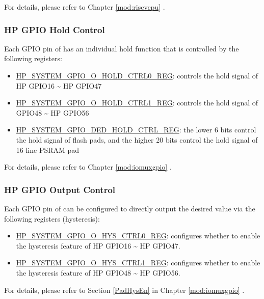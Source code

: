 \documentclass[main\_\_EN.tex]{subfiles}
\begin{document}
For details, please refer to Chapter \ref{mod:riscvcpu} \textit{}.

\subsubsection{HP GPIO Hold Control}

Each GPIO pin of \chipname{} has an individual hold function that is controlled by the following registers:

\begin{itemize}
    \item \hyperref[regdesc:HPSYSTEMGPIOOHOLDCTRL0REG]{HP\_SYSTEM\_GPIO\_O\_HOLD\_CTRL0\_REG}: controls the hold signal of HP GPIO16 \textasciitilde{} HP GPIO47
    \item \hyperref[regdesc:HPSYSTEMGPIOOHOLDCTRL1REG]{HP\_SYSTEM\_GPIO\_O\_HOLD\_CTRL1\_REG}: controls the hold signal of GPIO48 \textasciitilde{} HP GPIO56
    \item \hyperref[regdesc:HPSYSTEMGPIODEDHOLDCTRLREG]{HP\_SYSTEM\_GPIO\_DED\_HOLD\_CTRL\_REG}: the lower 6 bits control the hold signal of flash pads, and the higher 20 bits control the hold signal of 16 line PSRAM pad
\end{itemize}

For details, please refer to Chapter \ref{mod:iomuxgpio} \textit{}.

\subsubsection{HP GPIO Output Control}

Each GPIO pin of \chipname{} can be configured to directly output the desired value via the following registers (hysteresis):

\begin{itemize}
    \item \hyperref[regdesc:HPSYSTEMGPIOOHYSCTRL0REG]{HP\_SYSTEM\_GPIO\_O\_HYS\_CTRL0\_REG}: configures whether to enable the hysteresis feature of HP GPIO16 \textasciitilde{} HP GPIO47.
    \item \hyperref[regdesc:HPSYSTEMGPIOOHYSCTRL1REG]{HP\_SYSTEM\_GPIO\_O\_HYS\_CTRL1\_REG}: configures whether to enable the hysteresis feature of HP GPIO48 \textasciitilde{} HP GPIO56.
\end{itemize}

For details, please refer to Section \ref{PadHysEn} in Chapter \ref{mod:iomuxgpio} \textit{}.
\end{document}
